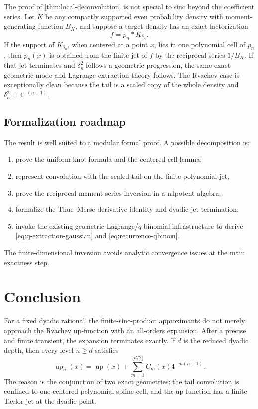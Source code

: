 \documentclass[11pt]{article}
\newcommand{\upf}{\operatorname{up}}
\begin{document}
The proof of \cref{thm:local-deconvolution} is not special to sinc beyond the
coefficient series.  Let \(K\) be any compactly supported even probability
density with moment-generating function \(B_K\), and suppose a target density
has an exact factorization
\[
 f=p_n*K_{\delta_n}.
\]
If the support of \(K_{\delta_n}\), when centered at a point \(x\), lies in one
polynomial cell of \(p_n\), then \(p_n(x)\) is obtained from the finite jet of
\(f\) by the reciprocal series \(1/B_K\).  If that jet terminates and
\(\delta_n^2\) follows a geometric progression, the same exact geometric-mode
and Lagrange-extraction theory follows.  The Rvachev case is exceptionally
clean because the tail is a scaled copy of the whole density and
\(\delta_n^2=4^{-(n+1)}\).

\subsection{Formalization roadmap}

The result is well suited to a modular formal proof.  A possible decomposition
is:
\begin{enumerate}[leftmargin=2.2em]
\item prove the uniform knot formula and the centered-cell lemma;
\item represent convolution with the scaled tail on the finite polynomial jet;
\item prove the reciprocal moment-series inversion in a nilpotent algebra;
\item formalize the Thue--Morse derivative identity and dyadic jet termination;
\item invoke the existing geometric Lagrange/\(q\)-binomial infrastructure to
      derive \cref{eq:q-extraction-gaussian} and
      \cref{eq:recurrence-qbinom}.
\end{enumerate}
The finite-dimensional inversion avoids analytic convergence issues at the
main exactness step.

\section{Conclusion}

For a fixed dyadic rational, the finite-sinc-product approximants do not merely
approach the Rvachev up-function with an all-orders expansion.  After a precise
and finite transient, the expansion terminates exactly.  If \(d\) is the
reduced dyadic depth, then every level \(n\ge d\) satisfies
\[
 \upf_n(x)=\upf(x)+\sum_{m=1}^{\lfloor d/2\rfloor}
 C_m(x)4^{-m(n+1)}.
\]
The reason is the conjunction of two exact geometries: the tail convolution is
confined to one centered polynomial spline cell, and the up-function has a
finite Taylor jet at the dyadic point.
\end{document}
